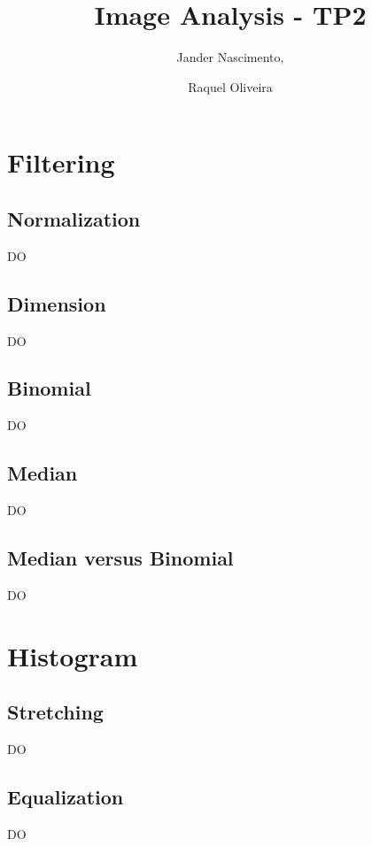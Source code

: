 \documentclass{report}
\begin{document}
\title{Image Analysis - TP2}

\author{Jander Nascimento, 
\and Raquel Oliveira}

\maketitle

\tableofcontents

\section{Filtering}

	\subsection{Normalization}

		DO
	
	\subsection{Dimension}

		DO

	\subsection{Binomial}

		DO

	\subsection{Median}

		DO

	\subsection{Median versus Binomial}

		DO

\section{Histogram}

	\subsection{Stretching}

		DO

	\subsection{Equalization}

		DO
\end{document}
